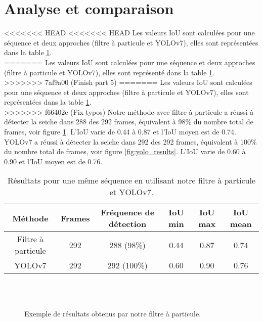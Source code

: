 \section{Analyse et comparaison}
<<<<<<< HEAD
<<<<<<< HEAD
Les valeurs IoU sont calculées pour une séquence et deux approches (filtre à particule et YOLOv7), elles sont représentées dans la table \ref{tab:results}.\\
=======
Les valeurs IoU sont calculées pour une séquence et deux approches (filtre à particule et YOLOv7), elles sont représenté dans la table \ref{tab:results}.\\
>>>>>>> 7af9a00 (Finish part 5)
=======
Les valeurs IoU sont calculées pour une séquence et deux approches (filtre à particule et YOLOv7), elles sont représentées dans la table \ref{tab:results}.\\
>>>>>>> f66402e (Fix typos)
Notre méthode avec filtre à particule a réussi à détecter la seiche dans 288 des 292 frames, équivalent à 98\% du nombre total de frames, voir figure \ref{fig:pf_results}. L'IoU varie de 0.44 à 0.87 et l'IoU moyen est de 0.74.\\
YOLOv7 a réussi à détecter la seiche dans 292 des 292 frames, équivalent à 100\% du nombre total de frames, voir figure \ref{fig:yolo_results}. L'IoU varie de 0.60 à 0.90 et l'IoU moyen est de 0.76.

\begin{table}[!htbp]
\begin{tabular}{|c|c|c|c|c|c|}
\hline
Méthode & Frames & Fréquence de détection & IoU min & IoU max & IoU mean\\
\hline
Filtre à particule & 292 & 288 (98\%) & 0.44 & 0.87 & 0.74\\
\hline
YOLOv7 & 292 & 292 (100\%) & 0.60 & 0.90 & 0.76\\
\hline
\end{tabular}
\caption{Résultats pour une même séquence en utilisant notre filtre à particule et YOLOv7.}
\label{tab:results}
\end{table}
\FloatBarrier

\begin{figure}[!htbp]
\center
	\hspace{0.1cm}
	\\
	\hspace{0.1cm}
	\\
	\hspace{0.1cm}
\caption{Exemple de résultats obtenus par notre filtre à particule.}
\label{fig:pf_results}
\end{figure}
\FloatBarrier

